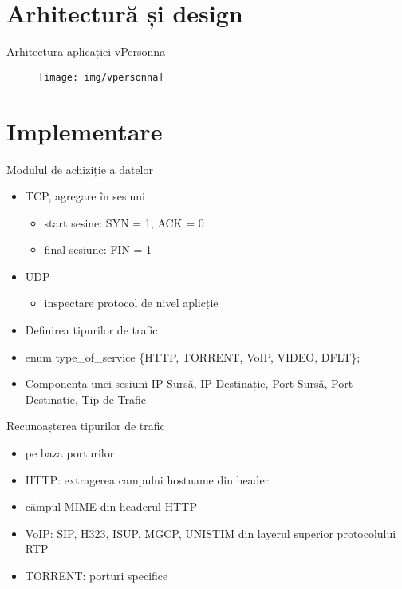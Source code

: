 \documentclass{beamer}
\begin{document}
\section{Arhitectură și design}

\begin{frame}{Arhitectura aplicației vPersonna}
\pause
	\begin{figure}
		{\texttt{[image: img/vpersonna]} }
	\end{figure}
\end{frame}

\section{Implementare}

\begin{frame}{Modulul de achiziție a datelor}
\pause
	\begin{itemize}[<+->]
		\item TCP, agregare în sesiuni
			\begin{itemize}
				\item start sesine: SYN = 1, ACK = 0
				\item final sesiune: FIN = 1
			\end{itemize}
		\item UDP
			\begin{itemize}
				\item inspectare protocol de nivel aplicție
			\end{itemize}
		\item Definirea tipurilor de trafic

		\item [] { \begin{beamerboxesrounded}[lower=block body,shadow=true]{}
				enum type\_of\_service \{HTTP, TORRENT, VoIP, VIDEO, DFLT\};
	
			   \end{beamerboxesrounded}
		}
		\item [] {\begin{block}{Componența unei sesiuni}
				IP Sursă, IP Destinație, Port Sursă, Port Destinație, Tip de Trafic
			   \end{block}
		}
	\end{itemize}	
\end{frame}

\begin{frame}{Recunoașterea tipurilor de trafic}
\pause
	\begin{itemize}[<+->]
		\item pe baza porturilor
		\item HTTP: extragerea campului hostname din header
		\item câmpul MIME din headerul HTTP
		\item VoIP: SIP, H323, ISUP, MGCP, UNISTIM din layerul superior protocolului RTP
		\item TORRENT: porturi specifice
	\end{itemize}
\end{frame}
\end{document}
